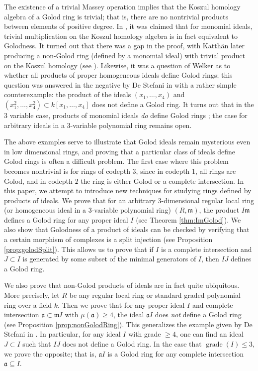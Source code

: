 \documentclass[10pt]{amsart}
\theoremstyle{definition}
\theoremstyle{remark}
\newtheorem{the context}[theorem]{The Context}
\numberwithin{equation}{theorem}
\numberwithin{equation}{section}
\newcommand{\grade}{\operatorname{grade}}
\newcommand{\ideal}[1]{\mathfrak{#1}}
\newcommand{\m}{\ideal{m}}
\renewcommand{\geq}{\geqslant}
\renewcommand{\leq}{\leqslant}
\newcommand{\mfa}{\mathfrak{a}}
\begin{document}
The existence of a trivial Massey operation implies that the Koszul homology algebra of a Golod ring is trivial; that is, there are no nontrivial products between elements of positive degree. In \cite[Theorem 5.1]{berglund2007golod}, it was claimed that for monomial ideals, trivial multiplication on the Koszul homology algebra is in fact equivalent to Golodness. It turned out that there was a gap in the proof, with Katth\"an later producing a non-Golod ring (defined by a monomial ideal) with trivial product on the Koszul homology (see \cite{katthan2017non}). Likewise, it was a question of Welker as to whether all products of proper homogeneous ideals define Golod rings; this question was answered in the negative by De Stefani in \cite{de2016products} with a rather simple counterexample: the product of the ideals $(x_1 , \dots , x_4)$ and $(x_1^2 , \dots , x_4^2) \subset k[x_1 , \dots , x_4]$ does not define a Golod ring. It turns out that in the $3$ variable case, products of monomial ideals \emph{do} define Golod rings \cite{dao2020monomial}; the case for arbitrary ideals in a $3$-variable polynomial ring remains open.

The above examples serve to illustrate that Golod ideals remain mysterious even in low dimensional rings, and proving that a particular class of ideals define Golod rings is often a difficult problem. The first case where this problem becomes nontrivial is for rings of codepth $3$, since in codepth $1$, all rings are Golod, and in codepth $2$ the ring is either Golod or a complete intersection. In this paper, we attempt to introduce new techniques for studying rings defined by products of ideals. We prove that for an arbitrary $3$-dimensional regular local ring (or homogeneous ideal in a $3$-variable polynomial ring) $(R,\m)$, the product $I \m$ defines a Golod ring for any proper ideal $I$ (see Theorem \ref{thm:ImGolod}). We also show that Golodness of a product of ideals can be checked by verifying that a certain morphism of complexes is a split injection (see Proposition \ref{prop:golodSplit}). This allows us to prove that if $I$ is a complete intersection and $J \subset I$ is generated by some subset of the minimal generators of $I$, then $IJ$ defines a Golod ring.

We also prove that non-Golod products of ideals are in fact quite ubiquitous. More precisely, let $R$ be any regular local ring or standard graded polynomial ring over a field $k$. Then we prove that for any proper ideal $I$ and complete intersection $\mfa \subset \m I$ with $\mu ( \mfa ) \geq 4$, the ideal $\mfa I$ does \emph{not} define a Golod ring (see Proposition \ref{prop:nonGolodRing}). This generalizes the example given by De Stefani in \cite{de2016products}. In particular, for any ideal $I$ with grade $\geq 4$, one can find an ideal $J \subset I$ such that $IJ$ does not define a Golod ring. In the case that $\grade (I) \leq 3$, we prove the opposite; that is, $\mfa I$ is a Golod ring for any complete intersection $\mfa \subseteq I$.
\end{document}
